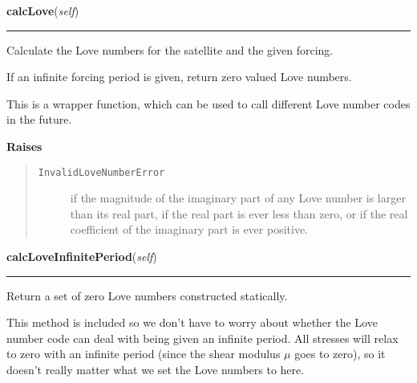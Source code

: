     \vspace{0.5ex}

\hspace{.8\funcindent}\begin{boxedminipage}{\funcwidth}

    \raggedright \textbf{calcLove}(\textit{self})

    \vspace{-1.5ex}

    \rule{\textwidth}{0.5\fboxrule}
\setlength{\parskip}{2ex}
    Calculate the Love numbers for the satellite and the given forcing.

    If an infinite forcing period is given, return zero valued Love 
    numbers.

    This is a wrapper function, which can be used to call different Love 
    number codes in the future.

\setlength{\parskip}{1ex}
      \textbf{Raises}
    \vspace{-1ex}

      \begin{quote}
        \begin{description}

          \item[\texttt{InvalidLoveNumberError}]

          if the magnitude of the imaginary part of any Love number is 
          larger than its real part, if the real part is ever less than 
          zero, or if the real coefficient of the imaginary part is ever 
          positive.

        \end{description}

      \end{quote}

    \end{boxedminipage}

    \label{satstress:SatStress:StressDef:calcLoveInfinitePeriod}

    \vspace{0.5ex}

\hspace{.8\funcindent}\begin{boxedminipage}{\funcwidth}

    \raggedright \textbf{calcLoveInfinitePeriod}(\textit{self})

    \vspace{-1.5ex}

    \rule{\textwidth}{0.5\fboxrule}
\setlength{\parskip}{2ex}
    Return a set of zero Love numbers constructed statically.

    This method is included so we don't have to worry about whether the 
    Love number code can deal with being given an infinite period.  All 
    stresses will relax to zero with an infinite period (since the shear 
    modulus \(\mu\) goes to zero), so it doesn't really matter what we set 
    the Love numbers to here.

\setlength{\parskip}{1ex}
    \end{boxedminipage}


